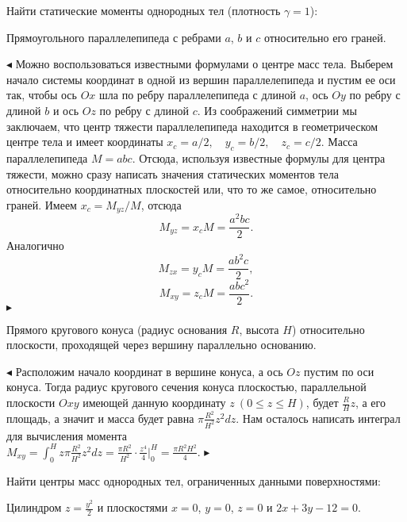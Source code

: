 \documentclass[a5paper,10pt]{article}
\begin{document}
\medskip
\noindent Найти статические моменты однородных тел (плотность $\gamma=1$):

\medskip
{} Прямоугольного параллелепипеда с ребрами $a$, $b$ и $c$ относительно его граней.

\smallskip\noindent
$\blacktriangleleft$ Можно воспользоваться известными формулами о центре масс тела.
Выберем начало системы координат в одной из вершин параллелепипеда и пустим ее оси так,
чтобы ось $Ox$ шла по ребру параллелепипеда с длиной $a$, ось $Oy$ по ребру с длиной $b$
и ось $Oz$ по ребру с длиной $c$. Из соображений симметрии мы заключаем, что центр тяжести
параллелепипеда находится в геометрическом центре тела и имеет координаты
$x_c=a/2,\quad y_c=b/2,\quad z_c=c/2$. Масса параллелепипеда $M=abc$. Отсюда,
используя известные формулы для центра тяжести, можно сразу написать значения
статических моментов тела относительно координатных плоскостей или, что то же самое,
относительно граней. Имеем $x_c=M_{yz}/M$, отсюда
$$M_{yz}=x_cM=\frac{a^2bc}{2}.$$
Аналогично
$$M_{zx}=y_cM=\frac{ab^2c}{2},$$
$$M_{xy}=z_cM=\frac{abc^2}{2}.$$
$\blacktriangleright$

\medskip
{} Прямого кругового конуса (радиус основания $R$, высота $H$) относительно плоскости, проходящей через вершину параллельно основанию.

\smallskip\noindent
$\blacktriangleleft$ Расположим начало координат в вершине конуса, а ось $Oz$ пустим
по оси конуса. Тогда радиус кругового сечения конуса плоскостью, параллельной плоскости
$Oxy$ имеющей данную координату $z\ (0\le z\le H)$, будет $\displaystyle \frac RHz$, а его площадь,
а значит и масса будет равна $\displaystyle \pi\frac {R^2}{H^2}z^2dz$. Нам осталось написать
интеграл для вычисления момента\\
$\displaystyle M_{xy}=\int_0^Hz\pi\frac {R^2}{H^2}z^2dz=
\frac {\pi R^2}{H^2}\cdot\frac{z^4}{4}\Big|_0^H=\frac {\pi R^2H^2}{4}$.
$\blacktriangleright$

\medskip
\noindent Найти центры масс однородных тел, ограниченных данными поверхностями:

\medskip
{} Цилиндром $\displaystyle z=\frac{y^2}{2}$ и плоскостями $x=0$, $y=0$, $z=0$ и $2x+3y-12=0$.
\end{document}
